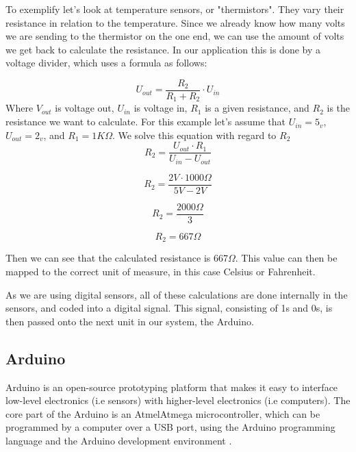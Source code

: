 To exemplify let's look at temperature sensors, or "thermistors". They vary their resistance in relation to the temperature. Since we already know how many volts we are sending to the thermistor on the one end, we can use the amount of volts we get back to calculate the resistance. In our application this is done by a voltage divider, which uses a formula as follows: 

\begin{equation}
U_{out}=\frac{R_{2}}{R_{1}+R_{2}}\cdot U_{in} 
\label{eq:vdiv1}
\end{equation}
Where $V_{out}$ is voltage out, $U_{in}$ is voltage in, $R_{1}$ is a given resistance, and $R_{2}$ is the resistance we want to calculate. For this example let's assume that $U_{in} = 5_{v}$, $U_{out} = 2_{v}$, and $R_{1} = 1K\Omega$. We solve this equation with regard to $R_{2}$
\begin{equation}
R_{2} = \frac{U_{out} \cdot R_{1}}{U_{in}-U_{out}}
\end{equation} 

\begin{equation}
R_{2} = \frac{2V \cdot 1000\Omega}{5V-2V}
\end{equation} 

\begin{equation}
R_{2} = \frac{2000\Omega}{3}
\end{equation} 

\begin{equation}
R_{2} = 667\Omega
\end{equation} 

Then we can see that the calculated resistance is 667$\Omega$. This value can then be mapped to the correct unit of measure, in this case Celsius or Fahrenheit. 

As we are using digital sensors, all of these calculations are done internally in the sensors, and coded into a digital signal. This signal, consisting of 1s and 0s, is then passed onto the next unit in our system, the Arduino.  

\subsection{Arduino}

Arduino is an open-source prototyping platform that makes it easy to interface low-level electronics (i.e sensors) with higher-level electronics (i.e computers). The core part of the Arduino is an Atmel\texttrademark Atmega microcontroller, which can be programmed by a computer over a USB port, using the Arduino programming language and the Arduino development environment \citep{Arduino}.

